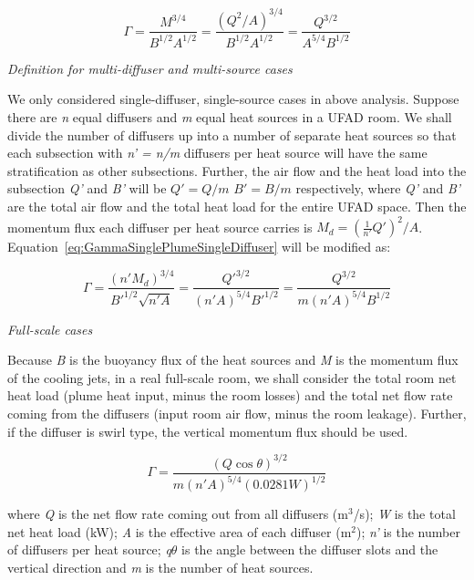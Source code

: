 \begin{equation}
\Gamma  = \frac{{{M^{3/4}}}}{{{B^{1/2}}{A^{1/2}}}} = \frac{{{{({Q^2}/A)}^{3/4}}}}{{{B^{1/2}}{A^{1/2}}}} = \frac{{{Q^{3/2}}}}{{{A^{5/4}}{B^{1/2}}}}
\label{eq:GammaSinglePlumeSingleDiffuser}
\end{equation}

\emph{Definition for multi-diffuser and multi-source cases}

We only considered single-diffuser, single-source cases in above analysis. Suppose there are \emph{n} equal diffusers and \emph{m} equal heat sources in a UFAD room. We shall divide the number of diffusers up into a number of separate heat sources so that each subsection with \emph{n' = n/m} diffusers per heat source will have the same stratification as other subsections. Further, the air flow and the heat load into the subsection \emph{Q'} and \emph{B'} will be \(Q' = Q/m\) \(B' = B/m\) respectively, where \emph{Q'} and \emph{B'} are the total air flow and the total heat load for the entire UFAD space. Then the momentum flux each diffuser per heat source carries is \({M_d} = {(\frac{1}{{n'}}Q')^2}/A\). Equation~\ref{eq:GammaSinglePlumeSingleDiffuser} will be modified as:

\begin{equation}
\Gamma  = \frac{{{{(n'{M_d})}^{3/4}}}}{{B{'^{1/2}}\sqrt {n'A} }} = \frac{{Q{'^{3/2}}}}{{{{(n'A)}^{5/4}}B{'^{1/2}}}} = \frac{{{Q^{3/2}}}}{{m{{(n'A)}^{5/4}}{B^{1/2}}}}
\label{eq:GammaMultiDiffuserMultiSource}
\end{equation}

\emph{Full-scale cases}

Because \emph{B} is the buoyancy flux of the heat sources and \emph{M} is the momentum flux of the cooling jets, in a real full-scale room, we shall consider the total room net heat load (plume heat input, minus the room losses) and the total net flow rate coming from the diffusers (input room air flow, minus the room leakage). Further, if the diffuser is swirl type, the vertical momentum flux should be used.

\begin{equation}
\Gamma  = \frac{{{{(Q\cos \theta )}^{3/2}}}}{{m{{(n'A)}^{5/4}}{{(0.0281W)}^{1/2}}}}
\label{eq:GammaFullScaleCases}
\end{equation}

where \emph{Q} is the net flow rate coming out from all diffusers (m\(^{3}\)/s); \emph{W} is the total net heat load (kW); \emph{A} is the effective area of each diffuser (m\(^{2}\)); \emph{n'} is the number of diffusers per heat source; \emph{q\(\theta\)} is the angle between the diffuser slots and the vertical direction and \emph{m} is the number of heat sources.

